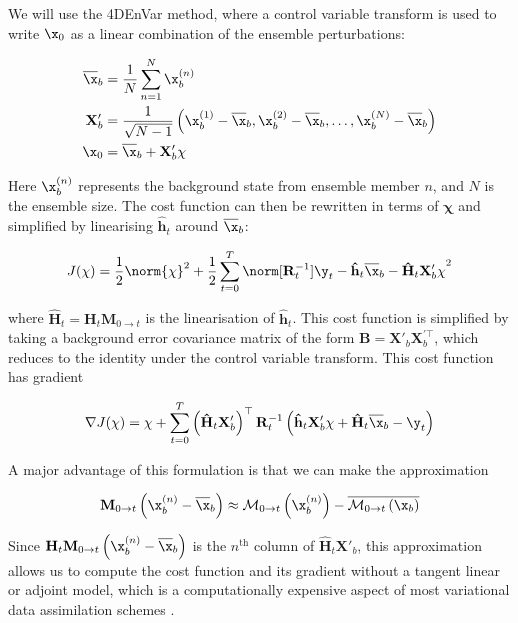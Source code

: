 We will use the 4DEnVar method, where a control variable transform is used to write $\x_0$ as a linear combination of the ensemble perturbations:

\begin{align*}
	\overline{\x}_b &= \frac 1 N \sum_{n=1}^N \x_b^{(n)} \\
	\mathbf{X}'_b &= \frac{1}{\sqrt{N- 1}} \left( \x_b^{(1)} - \overline{\x}_b, \x_b^{(2)} - \overline{\x}_b, \dots, \x_b^{(N)} - \overline{\x}_b \right) \\
	\x_0 &= \overline{\x}_b + \mathbf{X}'_b \mathbf{\chi}
\end{align*}

Here $\x_b^{(n)}$ represents the background state from ensemble member $n$, and $N$ is the ensemble size. The cost function can then be rewritten in terms of $\mathbf{\chi}$ and simplified by linearising $\mathbf{\hat{h}}_t$ around $\overline{\x}_b$:

\begin{equation}
J(\mathbf{\chi}) = \frac 1 2 \norm{\mathbf{\chi}}^2 + \frac 1 2 \sum_{t=0}^T \norm[\mathbf{R}_t^{-1}]{\y_t - \mathbf{\hat{h}}_t\overline{\x}_b - \mathbf{\hat{H}}_t \mathbf{X}'_b \mathbf{\chi}}^2
\end{equation}

where $\mathbf{\hat{H}}_t = \mathbf{H}_t\mathbf{M}_{0 \rightarrow t}$ is the linearisation of $\mathbf{\hat{h}}_t$. This cost function is simplified by taking a background error covariance matrix of the form $\mathbf{B} = \mathbf{X}'_b\mathbf{X}_b^{\prime\top}$, which reduces to the identity under the control variable transform. This cost function has gradient

\[
\nabla J(\mathbf{\chi}) = \mathbf{\chi} + \sum_{t=0}^T\left(\mathbf{\hat{H}}_t \mathbf{X}'_b\right)^\top \mathbf{R}_t^{-1} \left(\mathbf{\hat{h}}_t \mathbf{X}'_b \chi + \mathbf{\hat{H}}_t \overline{\x}_b - \y_t\right)
\]

A major advantage of this formulation is that we can make the approximation

\[
\mathbf{M}_{0 \rightarrow t} \left( \x^{(n)}_b - \overline{\x}_b \right) \approx \mathcal{M}_{0 \rightarrow t} \left( \x^{(n)}_b \right) - \overline{\mathcal{M}_{0 \rightarrow t} \left( \x_b \right)}
\]

Since $\mathbf{H}_t \mathbf{M}_{0 \rightarrow t} \left( \x^{(n)}_b - \overline{\x}_b \right)$ is the $n^{\text{th}}$ column of $\mathbf{\hat{H}}_t \mathbf{X}'_b$, this approximation allows us to compute the cost function and its gradient without a tangent linear or adjoint model, which is a computationally expensive aspect of most variational data assimilation schemes \citep{Bannister2017}.

